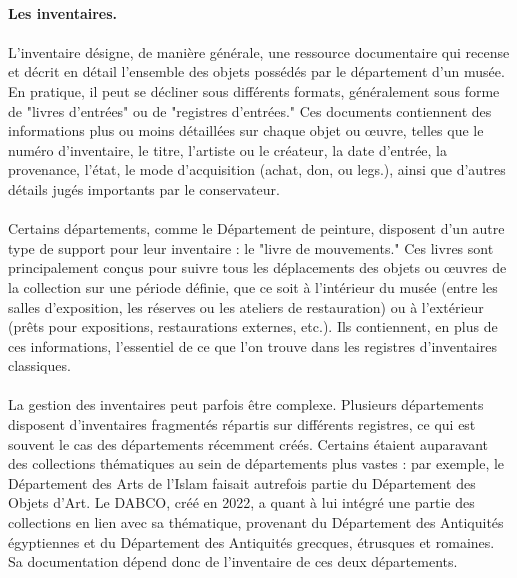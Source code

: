 \documentclass[a4paper,12pt,twoside]{book}
\begin{document}
\paragraph{Les inventaires.}

\paragraph{}
L'inventaire désigne, de manière générale, une ressource documentaire qui recense et décrit en détail l'ensemble des objets possédés par le département d’un musée. En pratique, il peut se décliner sous différents formats, généralement sous forme de "livres d'entrées" ou de "registres d'entrées." Ces documents contiennent des informations plus ou moins détaillées sur chaque objet ou œuvre, telles que le numéro d'inventaire, le titre, l'artiste ou le créateur, la date d'entrée, la provenance, l'état, le mode d'acquisition (achat, don, ou legs.), ainsi que d'autres détails jugés importants par le conservateur.

\paragraph{}
Certains départements, comme le Département de peinture, disposent d’un autre type de support pour leur inventaire : le "livre de mouvements." Ces livres sont principalement conçus pour suivre tous les déplacements des objets ou œuvres de la collection sur une période définie, que ce soit à l'intérieur du musée (entre les salles d'exposition, les réserves ou les ateliers de restauration) ou à l'extérieur (prêts pour expositions, restaurations externes, etc.). Ils contiennent, en plus de ces informations, l'essentiel de ce que l'on trouve dans les registres d'inventaires classiques.

\paragraph{}
La gestion des inventaires peut parfois être complexe. Plusieurs départements disposent d'inventaires fragmentés répartis sur différents registres, ce qui est souvent le cas des départements récemment créés. Certains étaient auparavant des collections thématiques au sein de départements plus vastes : par exemple, le Département des Arts de l’Islam faisait autrefois partie du Département des Objets d’Art. Le DABCO, créé en 2022, a quant à lui intégré une partie des collections en lien avec sa thématique, provenant du Département des Antiquités égyptiennes et du Département des Antiquités grecques, étrusques et romaines. Sa documentation dépend donc de l’inventaire de ces deux départements. 
\end{document}
